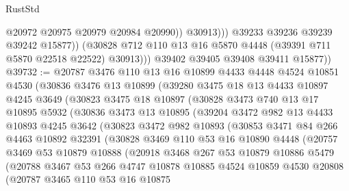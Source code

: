 \begin{lexlean}{RustStd}
\begin{coremodule}
                          @20972
                          @20975
                          @20979
                          @20984
                          @20990))
                      @30913)))
                @39233
                @39236
                @39239
                @39242
                @15877))
            (@30828 @712 @110 @13 @16 @5870 @4448 (@39391 @711 @5870 @22518 @22522) @30913)))
        @39402
        @39405
        @39408
        @39411
        @15877))
@39732 := @20787
    @3476
    @110
    @13
    @16
    @10899
    @4433
    @4448
    @4524
    @10851
    @4530
    (@30836
      @3476
      @13
      @10899
      (@39280
        @3475
        @18
        @13
        @4433
        @10897
        @4245
        @3649
        (@30823
          @3475
          @18
          @10897
          (@30828
            @3473
            @740
            @13
            @17
            @10895
            @5932
            (@30836
              @3473
              @13
              @10895
              (@39204
                @3472
                @982
                @13
                @4433
                @10893
                @4245
                @3642
                (@30823
                  @3472
                  @982
                  @10893
                  (@30853
                    @3471
                    @84
                    @266
                    @4463
                    @10892
                    @32391
                    (@30828
                      @3469
                      @110
                      @53
                      @16
                      @10890
                      @4448
                      (@20757
                        @3469
                        @53
                        @10879
                        @10888
                        (@20918
                          @3468
                          @267
                          @53
                          @10879
                          @10886
                          @5479
                          (@20788
                            @3467
                            @53
                            @266
                            @4747
                            @10878
                            @10885
                            @4524
                            @10859
                            @4530
                            @20808
                            (@20787
                              @3465
                              @110
                              @53
                              @16
                              @10875

\end{coremodule}
\end{lexlean}
